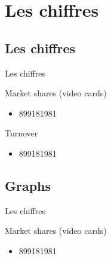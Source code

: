 \documentclass{beamer}
\begin{document}
\section{Les chiffres}
\subsection{Les chiffres}
\begin{frame}{Les chiffres}
	\transdissolve[duration=0.1] %
	\begin{block}{Market shares (video cards)}
		\begin{itemize}
			\item<+->{899181981}
		\end{itemize}
	\end{block}	
	\begin{block}{Turnover}
		\begin{itemize}
			\item<+->{899181981}
		\end{itemize}
	\end{block}
\end{frame}

\subsection{Graphs}
\begin{frame}{Les chiffres}
	\begin{block}{Market shares (video cards)}
		\begin{itemize}
			\item<+->{899181981}
		\end{itemize}
	\end{block}	
\end{frame}
\end{document}
